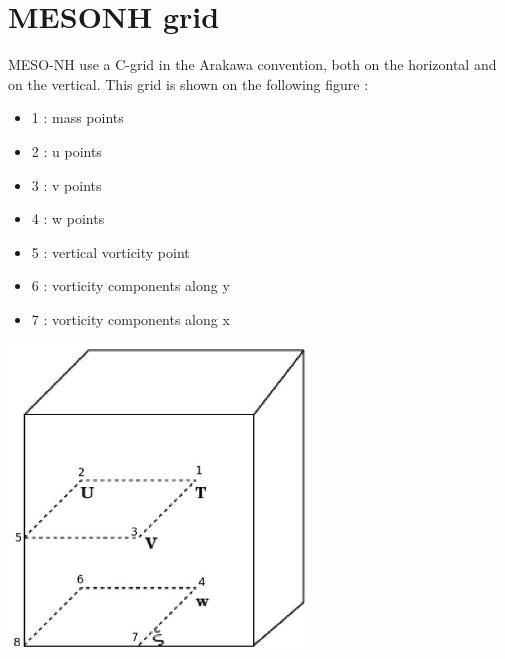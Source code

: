 \chapter{MESONH grid}  \label{a:grid}

MESO-NH use a C-grid in the Arakawa convention, both on the horizontal and on the vertical.
This grid is shown on the following figure :
\begin{itemize}
\item 1 : mass points 
\item 2 : u  points
\item 3 : v  points
\item 4 : w  points
\item 5 : vertical vorticity point
\item 6 : vorticity components along y
\item 7 : vorticity components along x
\end{itemize}
\begin{center}
\includegraphics[width=8cm]{annexes/grilles}
\end{center}
